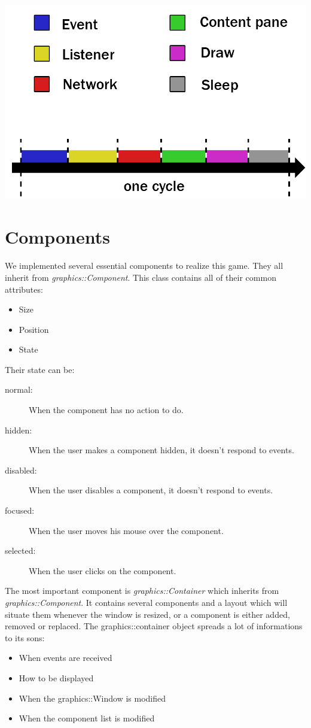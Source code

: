 \documentclass{scrreprt}
\begin{document}
		\begin{center}
		\includegraphics[scale=0.3]{windowCycle.jpg}
		\end{center}

		\section{Components}
		We implemented several essential components to realize this game. They all inherit from \emph{graphics::Component}. This class contains all of their common attributes:
			\begin{itemize}
			\item{Size}
			\item{Position}
			\item{State}
			\end{itemize}

			Their state can be:
			\begin{description}
			\item[normal:]{When the component has no action to do.}
			\item[hidden:]{When the user makes a component hidden, it doesn't respond to events.}
			\item[disabled:]{When the user disables a component, it doesn't respond to events.}
			\item[focused:]{When the user moves his mouse over the component.}
			\item[selected:]{When the user clicks on the component.}
			\end{description}

		  The most important component is \emph{graphics::Container} which inherits from \emph{graphics::Component}. It contains several components and a layout which will situate them whenever the window is resized, or a component is either added, removed or replaced. The graphics::container object spreads a lot of informations to its sons:
		  \begin{itemize}
		  \item{When events are received}
		  \item{How to be displayed}
		  \item{When the graphics::Window is modified}
		  \item{When the component list is modified}
		  \end{itemize}
\end{document}
